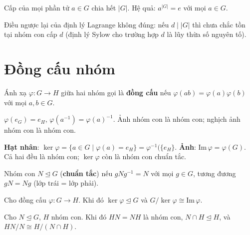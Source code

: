 \documentclass[12pt,a4paper]{article}
\begin{document}
\begin{dinhly}
  Cấp của mọi phần tử $a \in G$ chia hết $|G|$. Hệ quả: $a^{|G|} = e$ với mọi $a \in G$.
\end{dinhly}

\begin{luuy}
  Điều ngược lại của định lý Lagrange không đúng: nếu $d \mid |G|$ thì chưa chắc tồn tại nhóm con cấp $d$ (định lý Sylow cho trường hợp $d$ là lũy thừa số nguyên tố).
\end{luuy}

\section{Đồng cấu nhóm}

\begin{dinhnghia}
  Ánh xạ $\varphi: G \to H$ giữa hai nhóm gọi là \textbf{đồng cấu} nếu $\varphi(ab) = \varphi(a)\varphi(b)$ với mọi $a, b \in G$.
\end{dinhnghia}

\begin{tinhchat}
  $\varphi(e_G) = e_H$, $\varphi(a^{-1}) = \varphi(a)^{-1}$. Ảnh nhóm con là nhóm con; nghịch ảnh nhóm con là nhóm con.
\end{tinhchat}

\begin{dinhnghia}
  \textbf{Hạt nhân}: $\ker \varphi = \{a \in G \mid \varphi(a) = e_H\} = \varphi^{-1}(\{e_H\}$. \textbf{Ảnh}: $\mathrm{Im}\,\varphi = \varphi(G)$. Cả hai đều là nhóm con; $\ker \varphi$ còn là nhóm con chuẩn tắc.
\end{dinhnghia}

\begin{dinhnghia}
  Nhóm con $N \trianglelefteq G$ (\textbf{chuẩn tắc}) nếu $gNg^{-1} = N$ với mọi $g \in G$, tương đương $gN = Ng$ (lớp trái = lớp phải).
\end{dinhnghia}

\begin{dinhly}[title={Định lý đồng cấu thứ nhất}]
  Cho đồng cấu $\varphi: G \to H$. Khi đó $\ker \varphi \trianglelefteq G$ và $G/\ker \varphi \cong \mathrm{Im}\,\varphi$.
\end{dinhly}

\begin{dinhly}[title={Định lý đồng cấu thứ hai}]
  Cho $N \trianglelefteq G$, $H$ nhóm con. Khi đó $HN = NH$ là nhóm con, $N \cap H \trianglelefteq H$, và $HN/N \cong H/(N \cap H)$.
\end{dinhly}
\end{document}
